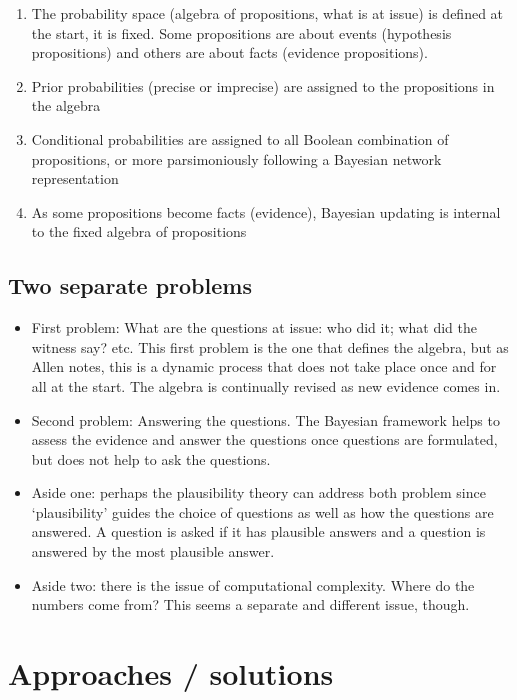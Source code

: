 \documentclass[
  11pt,
  dvipsnames,enabledeprecatedfontcommands]{scrartcl}
\begin{document}
\begin{enumerate}
\def\labelenumi{\arabic{enumi}.}
\item
  The probability space (algebra of propositions, what is at issue) is
  defined at the start, it is fixed. Some propositions are about events
  (hypothesis propositions) and others are about facts (evidence
  propositions).
\item
  Prior probabilities (precise or imprecise) are assigned to the
  propositions in the algebra
\item
  Conditional probabilities are assigned to all Boolean combination of
  propositions, or more parsimoniously following a Bayesian network
  representation
\item
  As some propositions become facts (evidence), Bayesian updating is
  internal to the fixed algebra of propositions
\end{enumerate}

\hypertarget{two-separate-problems}{%
\subsection{Two separate problems}\label{two-separate-problems}}

\begin{itemize}
\item
  First problem: What are the questions at issue: who did it; what did
  the witness say? etc. This first problem is the one that defines the
  algebra, but as Allen notes, this is a dynamic process that does not
  take place once and for all at the start. The algebra is continually
  revised as new evidence comes in.
\item
  Second problem: Answering the questions. The Bayesian framework helps
  to assess the evidence and answer the questions once questions are
  formulated, but does not help to ask the questions.
\item
  Aside one: perhaps the plausibility theory can address both problem
  since `plausibility' guides the choice of questions as well as how the
  questions are answered. A question is asked if it has plausible
  answers and a question is answered by the most plausible answer.
\item
  Aside two: there is the issue of computational complexity. Where do
  the numbers come from? This seems a separate and different issue,
  though.
\end{itemize}

\hypertarget{approaches-solutions}{%
\section{Approaches / solutions}\label{approaches-solutions}}
\end{document}

